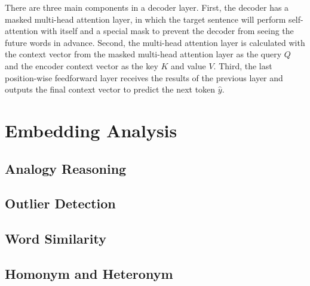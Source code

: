 There are three main components in a decoder layer. First, the decoder has a masked multi-head attention layer, in which the target sentence will perform self-attention with itself and a special mask to prevent the decoder from seeing the future words in advance. Second, the multi-head attention layer is calculated with the context vector from the masked multi-head attention layer as the query $Q$ and the encoder context vector as the key $K$ and value $V$. Third, the last position-wise feedforward layer receives the results of the previous layer and outputs the final context vector to predict the next token $\hat{y}$.

\section{Embedding Analysis} \label{sec:embedding_analysis}


\subsection{Analogy Reasoning} \label{sec:analogy}


\subsection{Outlier Detection} \label{sec:outlier}


\subsection{Word Similarity} \label{sec:similarity}


\subsection{Homonym and Heteronym} \label{sec:homonym_heteronym}

